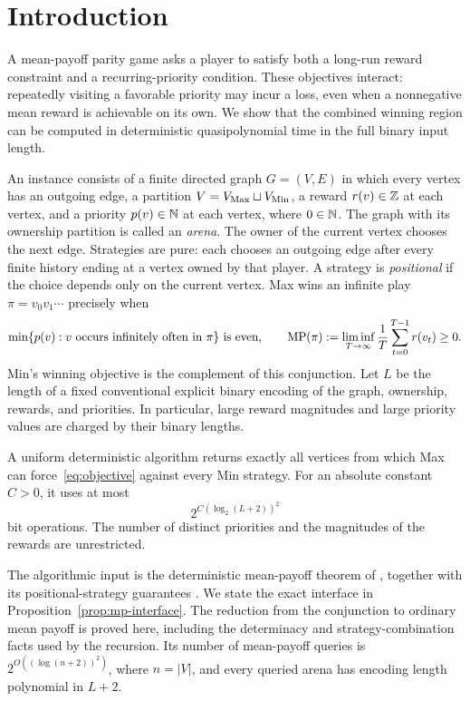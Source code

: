 \section{Introduction}
\label{sec:introduction}

A mean-payoff parity game asks a player to satisfy both a long-run
reward constraint and a recurring-priority condition. These objectives
interact: repeatedly visiting a favorable priority may incur a loss,
even when a nonnegative mean reward is achievable on its own. We show
that the combined winning region can be computed in deterministic
quasipolynomial time in the full binary input length.

An instance consists of a finite directed graph $G=(V,E)$ in which
every vertex has an outgoing edge, a partition
$V=V_{\mathrm{Max}}\sqcup V_{\mathrm{Min}}$, a reward $r(v)\in\mathbb Z$ at each vertex,
and a priority $p(v)\in\mathbb N$ at each vertex, where $0\in\mathbb N$.
The graph with its ownership partition is called an \emph{arena}.
The owner of the current vertex chooses the next edge. Strategies are
pure: each chooses an outgoing edge after every finite history ending
at a vertex owned by that player. A strategy is \emph{positional} if
the choice depends only on the current vertex. Max wins an infinite
play $\pi=v_0v_1\cdots$ precisely when
\begin{equation}\label{eq:objective}
 \min\{p(v):v\text{ occurs infinitely often in }\pi\}
 \text{ is even},\qquad
 \operatorname{MP}(\pi):=\liminf_{T\to\infty}
       \frac1T\sum_{t=0}^{T-1}r(v_t)\ge0.
\end{equation}
Min's winning objective is the complement of this conjunction.
Let $L$ be the length of a fixed conventional explicit binary encoding
of the graph, ownership, rewards, and priorities. In particular, large
reward magnitudes and large priority values are charged by their
binary lengths.

\begin{theorem}\label{thm:main}
A uniform deterministic algorithm returns exactly all vertices from
which Max can force~\eqref{eq:objective} against every Min strategy.
For an absolute constant $C>0$, it uses at most
\[
                     2^{C(\log_2(L+2))^2}
\]
bit operations. The number of distinct priorities and the magnitudes
of the rewards are unrestricted.
\end{theorem}

The algorithmic input is the deterministic mean-payoff theorem of
\cite[Theorem~1.1]{OpenAI2026Deterministic}, together with its
positional-strategy guarantees
\cite[Corollary~7.1]{OpenAI2026Deterministic}.
We state the exact interface in Proposition~\ref{prop:mp-interface}.
The reduction from the conjunction to ordinary mean payoff is proved
here, including the determinacy and strategy-combination facts used
by the recursion. Its number of mean-payoff queries is
$2^{O((\log(n+2))^2)}$, where $n=|V|$, and every queried arena has
encoding length polynomial in $L+2$.

